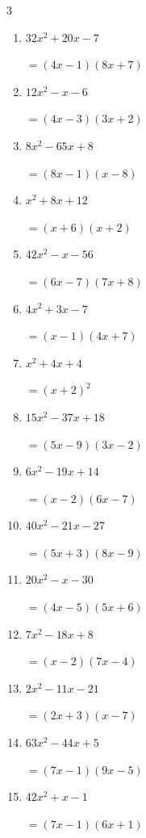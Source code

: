 \begin{multicols}{3}
\begin{enumerate}
        $=(8x+5)(x-3)$

  \item $32x^{2}+20x-7$

        $=(4x-1)(8x+7)$

  \item $12x^{2}-x-6$

        $=(4x-3)(3x+2)$

  \item $8x^{2}-65x+8$

        $=(8x-1)(x-8)$

  \item $x^{2}+8x+12$

        $=(x+6)(x+2)$

  \item $42x^{2}-x-56$

        $=(6x-7)(7x+8)$

\columnbreak %

  \item $4x^{2}+3x-7$

        $=(x-1)(4x+7)$

  \item $x^{2}+4x+4$

        $=(x+2)^{2}$

  \item $15x^{2}-37x+18$

        $=(5x-9)(3x-2)$

  \item $6x^{2}-19x+14$

        $=(x-2)(6x-7)$

  \item $40x^{2}-21x-27$

        $=(5x+3)(8x-9)$

  \item $20x^{2}-x-30$

        $=(4x-5)(5x+6)$

  \item $7x^{2}-18x+8$

        $=(x-2)(7x-4)$

  \item $2x^{2}-11x-21$

        $=(2x+3)(x-7)$

  \item $63x^{2}-44x+5$

        $=(7x-1)(9x-5)$

  \item $42x^{2}+x-1$

        $=(7x-1)(6x+1)$


\end{enumerate}
\end{multicols}

